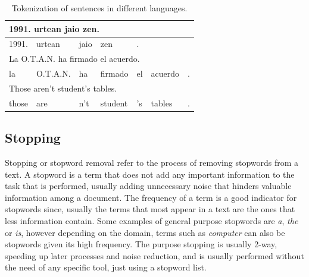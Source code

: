 \documentclass{bsu-ms}
\begin{document}
\begin{table}[h]
\centering
\begin{tabular}{|l|l|l|l|l|l|l|}
\hline
\multicolumn{7}{|l|}{1991. urtean jaio zen.} \\ \hline
1991. & urtean & jaio & zen & . &  &  \\ 
\hline \hline
\multicolumn{7}{|l|}{La O.T.A.N. ha firmado el acuerdo.} \\ \hline
la & O.T.A.N. & ha & firmado & el & acuerdo & . \\ 

 \hline \hline
\multicolumn{7}{|l|}{Those aren't student's tables.} \\ \hline
those & are & n't & student & 's & tables & . \\ \hline
\end{tabular}
\caption{Tokenization of sentences in different languages.}
\label{tab:tokenization}
\end{table}

\subsection{Stopping}
Stopping or stopword removal refer to the process of removing stopwords from a text. A stopword is a term that does not add any important information to the task that is performed, usually adding unnecessary noise that hinders valuable information among a document. The frequency of a term is a good indicator for stopwords since, usually the terms that most appear in a text are the ones that less information contain. Some examples of general purpose stopwords are \emph{a}, \emph{the} or \emph{is}, however depending on the domain, terms such as \emph{computer} can also be stopwords given its high frequency. The purpose stopping is usually 2-way, speeding up later processes and noise reduction, and is usually performed without the need of any specific tool, just using a stopword list. 
\end{document}

